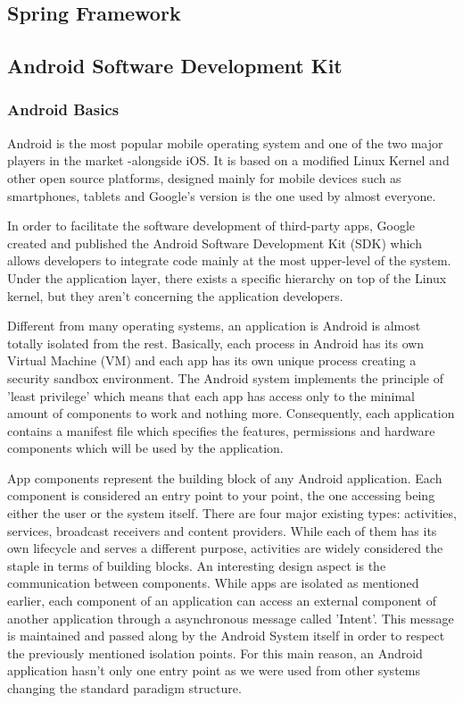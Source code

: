 \subsection{Spring Framework}

\subsection{Android Software Development Kit}

\subsubsection{Android Basics}

Android is the most popular mobile operating system and one of the two major players in the market -alongside iOS. It is based on a modified Linux Kernel and other open source platforms, designed mainly for mobile devices such as smartphones, tablets and Google's version is the one used by almost everyone.

In order to facilitate the software development of third-party apps, Google created and published the Android Software Development Kit (SDK) which allows developers to integrate code mainly at the most upper-level of the system. Under the application layer, there exists a specific hierarchy on top of the Linux kernel, but they aren't concerning the application developers.

Different from many operating systems, an application is Android is almost totally isolated from the rest. Basically, each process in Android has its own Virtual Machine (VM) and each app has its own unique process creating a security sandbox environment. The Android system implements the principle of 'least privilege' which means that each app has access only to the minimal amount of components to work and nothing more. Consequently, each application contains a manifest file which specifies the features, permissions and hardware components which will be used by the application. 

App components represent the building block of any Android application. Each component is considered an entry point to your point, the one accessing being either the user or the system itself. There are four major existing types: activities, services, broadcast receivers and content providers. While each of them has its own lifecycle
and serves a different purpose, activities are widely considered the staple in terms of building blocks. An interesting design aspect is the communication between components. While apps are isolated as mentioned earlier, each component of an application can access an external component of another application through a asynchronous message called 'Intent'. This message is maintained and passed along by the Android System itself in order to respect the previously mentioned isolation points. For this main reason, an Android application hasn't only one entry point as we were used from other systems changing the standard paradigm structure.

